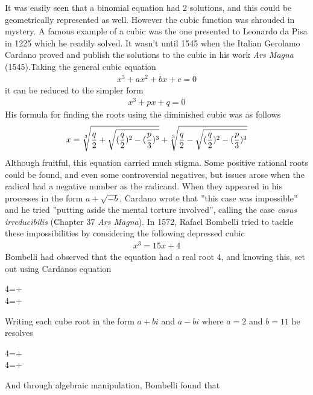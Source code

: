 \documentclass[12pt]{article}
\begin{document}
 It was easily seen that a binomial equation had 2 solutions, and this could be geometrically represented as well. However the cubic function was shrouded in mystery. A famous example of a cubic was the one presented to Leonardo da Pisa in 1225 which he readily solved. It wasn’t until 1545 when the Italian Gerolamo Cardano proved and publish the solutions to the cubic in his work \textit{Ars Magna} (1545).Taking the general cubic equation
\begin{align*}
    x^3+ax^2+bx+c=0
\end{align*}
it can be reduced to the simpler form
\begin{align*}
    x^3+px+q=0
\end{align*}
 His formula for finding the roots using the diminished cubic was as follows
\begin{align*}
x=\root 3\of{\dfrac{q}{2}+\sqrt{(\dfrac{q}{2})^2-(\dfrac{p}{3})^3}}+\root 3\of{\dfrac{q}{2}-\sqrt{(\dfrac{q}{2})^2-(\dfrac{p}{3})^3}}
\end{align*}
\hspace{\parindent} Although fruitful, this equation carried much stigma. Some positive rational roots could be found, and even some controversial negatives, but issues arose when the radical had a negative number as the radicand. When they appeared in his processes in the form $a+\sqrt{-b}$, Cardano wrote that ''this case was impossible'' and he tried ''putting aside the mental torture involved'', calling the case \textit{casus irreducibilis} (Chapter 37 \textit{Ars Magna}). In 1572, Rafael Bombelli tried to tackle these impossibilities by considering the following depressed cubic
\begin{align*}
x^3=15x+4
\end{align*}
Bombelli had observed that the equation had a real root $4$, and knowing this, set out using Cardanos equation
\begin{center}
   4=+\\
   4=+\\
\end{center}
Writing each cube root in the form $a+bi$ and $a-bi$ where $a=2$ and $b=11$ he resolves
\begin{center}
4=+\\
4=+\\
\end{center}
And through algebraic manipulation, Bombelli found that
\end{document}
